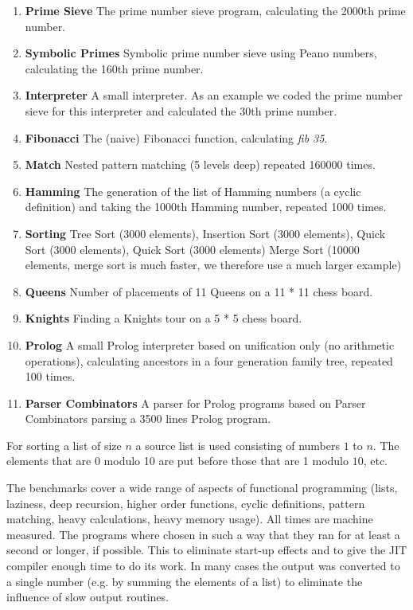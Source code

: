 \begin{enumerate}
\item {\bf Prime Sieve} The prime number sieve program, calculating the 2000th
prime number.
\item {\bf Symbolic Primes} Symbolic prime number sieve using Peano numbers,
calculating the 160th prime number.
\item {\bf Interpreter} A small \Sapl  interpreter. As an example we coded the prime
number sieve for this interpreter and calculated the 30th prime number.
\item {\bf Fibonacci} The (naive) Fibonacci function, calculating {\em fib 35}.
\item {\bf Match} Nested pattern matching (5 levels deep) repeated 160000 times.
\item {\bf Hamming} The generation of the list of Hamming numbers (a cyclic
definition) and taking the 1000th Hamming number, repeated 1000 times.
\item {\bf Sorting} Tree Sort (3000 elements), Insertion Sort (3000 elements), Quick Sort (3000 elements), Quick Sort (3000 elements) Merge
Sort (10000 elements, merge sort is much faster, we therefore use a much larger example)
\item {\bf Queens} Number of placements of 11 Queens on a 11 * 11 chess board.
\item {\bf Knights} Finding a Knights tour on a 5 * 5 chess board.
\item {\bf Prolog} A small Prolog interpreter based on unification only (no
arithmetic operations), calculating ancestors in a four generation family tree,
repeated 100 times.
\item {\bf Parser Combinators} A parser for Prolog programs based on Parser
Combinators parsing a 3500 lines Prolog program.
\end{enumerate}
%
For sorting a list of size $n$ a source list is  used consisting of numbers $1$
to $n$. The elements that are 0 modulo 10 are put before those that are 1 modulo
$10$, etc.

The benchmarks cover a wide range of aspects of functional programming (lists, laziness, 
deep recursion, higher order functions, cyclic definitions, pattern matching, 
heavy calculations, heavy memory usage).
All times are machine measured. The programs where chosen in such a way that
they ran for at least a second or longer, if possible. This to eliminate start-up 
effects and to give the JIT compiler enough time to do its work. 
In many cases the output was converted to a single number (e.g. 
by summing the elements of a list) to eliminate the influence of slow output 
routines.

